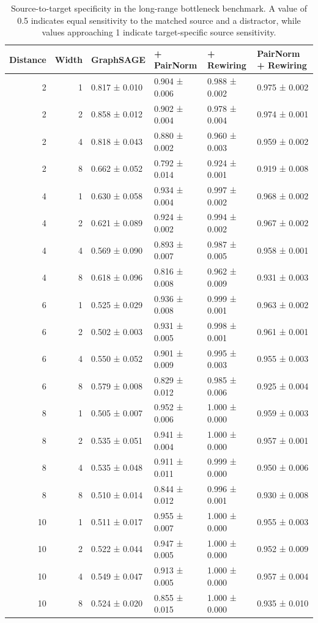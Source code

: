 \begin{table}[htbp]
\caption{Source-to-target specificity in the long-range bottleneck benchmark. A value of 0.5 indicates equal sensitivity to the matched source and a distractor, while values approaching 1 indicate target-specific source sensitivity.}
\label{tab:longrange_specificity}
\begin{tabular}{rrllll}
\toprule
Distance & Width & GraphSAGE & + PairNorm & + Rewiring & PairNorm + Rewiring \\
\midrule
2 & 1 & 0.817 ± 0.010 & 0.904 ± 0.006 & 0.988 ± 0.002 & 0.975 ± 0.002 \\
2 & 2 & 0.858 ± 0.012 & 0.902 ± 0.004 & 0.978 ± 0.004 & 0.974 ± 0.001 \\
2 & 4 & 0.818 ± 0.043 & 0.880 ± 0.002 & 0.960 ± 0.003 & 0.959 ± 0.002 \\
2 & 8 & 0.662 ± 0.052 & 0.792 ± 0.014 & 0.924 ± 0.001 & 0.919 ± 0.008 \\
4 & 1 & 0.630 ± 0.058 & 0.934 ± 0.004 & 0.997 ± 0.002 & 0.968 ± 0.002 \\
4 & 2 & 0.621 ± 0.089 & 0.924 ± 0.002 & 0.994 ± 0.002 & 0.967 ± 0.002 \\
4 & 4 & 0.569 ± 0.090 & 0.893 ± 0.007 & 0.987 ± 0.005 & 0.958 ± 0.001 \\
4 & 8 & 0.618 ± 0.096 & 0.816 ± 0.008 & 0.962 ± 0.009 & 0.931 ± 0.003 \\
6 & 1 & 0.525 ± 0.029 & 0.936 ± 0.008 & 0.999 ± 0.001 & 0.963 ± 0.002 \\
6 & 2 & 0.502 ± 0.003 & 0.931 ± 0.005 & 0.998 ± 0.001 & 0.961 ± 0.001 \\
6 & 4 & 0.550 ± 0.052 & 0.901 ± 0.009 & 0.995 ± 0.003 & 0.955 ± 0.003 \\
6 & 8 & 0.579 ± 0.008 & 0.829 ± 0.012 & 0.985 ± 0.006 & 0.925 ± 0.004 \\
8 & 1 & 0.505 ± 0.007 & 0.952 ± 0.006 & 1.000 ± 0.000 & 0.959 ± 0.003 \\
8 & 2 & 0.535 ± 0.051 & 0.941 ± 0.004 & 1.000 ± 0.000 & 0.957 ± 0.001 \\
8 & 4 & 0.535 ± 0.048 & 0.911 ± 0.011 & 0.999 ± 0.000 & 0.950 ± 0.006 \\
8 & 8 & 0.510 ± 0.014 & 0.844 ± 0.012 & 0.996 ± 0.001 & 0.930 ± 0.008 \\
10 & 1 & 0.511 ± 0.017 & 0.955 ± 0.007 & 1.000 ± 0.000 & 0.955 ± 0.003 \\
10 & 2 & 0.522 ± 0.044 & 0.947 ± 0.005 & 1.000 ± 0.000 & 0.952 ± 0.009 \\
10 & 4 & 0.549 ± 0.047 & 0.913 ± 0.005 & 1.000 ± 0.000 & 0.957 ± 0.004 \\
10 & 8 & 0.524 ± 0.020 & 0.855 ± 0.015 & 1.000 ± 0.000 & 0.935 ± 0.010 \\
\bottomrule
\end{tabular}
\end{table}
